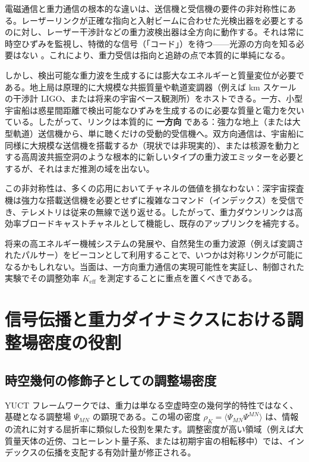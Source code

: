 \documentclass[12pt,a4paper]{article}
\begin{document}
	電磁通信と重力通信の根本的な違いは、送信機と受信機の要件の非対称性にある。レーザーリンクが正確な指向と入射ビームに合わせた光検出器を必要とするのに対し、レーザー干渉計などの重力波検出器は全方向に動作する。それは常に時空ひずみを監視し、特徴的な信号（「コード」）を待つ——光源の方向を知る必要はない \cite{LIGO}。これにより、重力受信は指向と追跡の点で本質的に単純になる。
	
	しかし、検出可能な重力波を生成するには膨大なエネルギーと質量変位が必要である。地上局は原理的に大規模な共振質量や軌道変調器（例えば km スケールの干渉計 LIGO、または将来の宇宙ベース観測所）をホストできる。一方、小型宇宙船は惑星間距離で検出可能なひずみを生成するのに必要な質量と電力を欠いている。したがって、リンクは本質的に \textbf{一方向} である：強力な地上（または大型軌道）送信機から、単に聴くだけの受動的受信機へ。双方向通信は、宇宙船に同様に大規模な送信機を搭載するか（現状では非現実的）、または核源を動力とする高周波共振空洞のような根本的に新しいタイプの重力波エミッターを必要とするが、それはまだ推測の域を出ない。
	
	この非対称性は、多くの応用においてチャネルの価値を損なわない：深宇宙探査機は強力な搭載送信機を必要とせずに複雑なコマンド（インデックス）を受信でき、テレメトリは従来の無線で送り返せる。したがって、重力ダウンリンクは高効率ブロードキャストチャネルとして機能し、既存のアップリンクを補完する。
	
	将来の高エネルギー機械システムの発展や、自然発生の重力波源（例えば変調されたパルサー）をビーコンとして利用することで、いつかは対称リンクが可能になるかもしれない。当面は、一方向重力通信の実現可能性を実証し、制御された実験でその調整効率 \(K_{\mathrm{eff}}\) を測定することに重点を置くべきである。
	
	\section{信号伝播と重力ダイナミクスにおける調整場密度の役割}
	\label{sec:coord-density}
	
	\subsection{時空幾何の修飾子としての調整場密度}
	
	YUCT フレームワークでは、重力は単なる空虚時空の幾何学的特性ではなく、基礎となる調整場 \(\Psi_{MN}\) の顕現である。この場の密度 \(\rho_K = \langle \Psi_{MN}\Psi^{MN} \rangle\) は、情報の流れに対する屈折率に類似した役割を果たす。調整密度が高い領域（例えば大質量天体の近傍、コヒーレント量子系、または初期宇宙の相転移中）では、インデックスの伝播を支配する有効計量が修正される。
	
\end{document}
